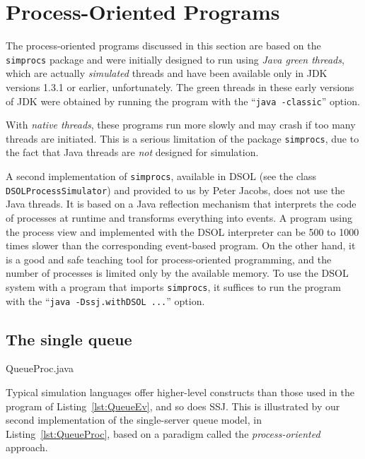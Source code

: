\section {Process-Oriented Programs}
\label {sec:process}

The process-oriented programs discussed in this section are
based on the \texttt{simprocs} package and were initially designed
to run using \emph{Java green threads}, which are actually \emph{simulated}
threads and have been available only in JDK versions 1.3.1 or earlier,
unfortunately.
The green threads in these early versions of JDK were obtained
by running the program with the ``\texttt{java -classic}'' option.

With \emph{native threads}, these programs run more slowly
and may crash if too many threads are initiated.
This is a serious limitation of the package \texttt{simprocs},
due to the fact that Java threads are \emph{not} designed for simulation.

A second implementation of \texttt{simprocs}, available in DSOL
(see the class \texttt{DSOLProcess\-Simulator})
and provided to us by Peter Jacobs, does not use the Java threads.
It is based on a Java reflection mechanism
that interprets the code of processes at runtime and transforms everything into events.
A program using the process view and implemented with the DSOL interpreter
can be 500 to 1000 times slower than the corresponding event-based program.
On the other hand, it is a good and safe teaching tool for process-oriented programming,
and the number of processes is limited only by the available memory.
To use the DSOL system with a program that imports \texttt{simprocs},
it suffices to run the program with
the ``\texttt{java -Dssj.withDSOL ...}'' option.



\subsection {The single queue}

%
{QueueProc.java}

Typical simulation languages offer higher-level constructs than those used
in the program of Listing~\ref{lst:QueueEv}, and so does SSJ.
This is illustrated by our second implementation of the single-server
queue model, in Listing~\ref{lst:QueueProc}, based on a
paradigm called the {\em process-oriented\/} approach.


